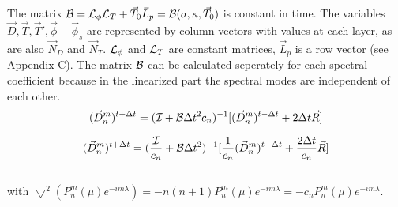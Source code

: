 The matrix $ {\cal B} = {\cal L}_{\phi} {\cal L}_T + \vec{T}_0 \vec{L}_p = 
{\cal B}(\sigma , \kappa , \vec{T}_0)$ 
is constant in time. 
The variables ${\vec{D},\vec{T},\vec{T}',\vec{\phi}-\vec{\phi}_s}$
are represented by column vectors with values
at each layer, as are also $\vec{N}_D$ and $\vec{N}_T$.
${\cal L}_{\phi}$ and ${\cal L}_T$ are constant matrices, $\vec{L}_p$ 
is a row vector (see Appendix C). 
The matrix  $ {\cal B}$ can be calculated seperately for
each spectral coefficient because in the linearized part
the spectral modes are independent of each other.
\begin{equation}
(\vec{D}_n^{m})^{t + \Delta t} =
({\cal I} + {\cal B} \Delta t^2 c_n)^{-1} 
[(\vec{D}_n^{m})^{t - \Delta t}
+ 2 \Delta t \vec{R}]
\end{equation}

\begin{equation}
(\vec{D}_n^{m})^{t + \Delta t} =
(\frac{{\cal I}}{c_n} + {\cal B} \Delta t^2)^{-1} 
[\frac{1}{c_n}(\vec{D}_n^{m})^{t - \Delta t}
+ \frac{2 \Delta t}{c_n} \vec{R}]
\end{equation}\\


with $\bigtriangledown^2 (P_n^m (\mu) e^{ -i m \lambda})=- n(n+1) P_n^m (\mu) e^{
  -i m \lambda} =- c_n P_n^m (\mu) e^{ -i m \lambda} $.
